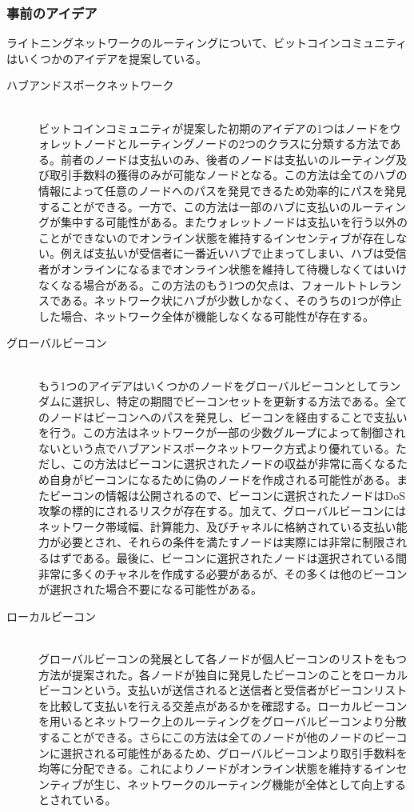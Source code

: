 \documentclass[12pt]{jarticle}
\begin{document}
\subsubsection{事前のアイデア} \label{sec:idea}
ライトニングネットワークのルーティングについて、ビットコインコミュニティはいくつかのアイデアを提案している。
\begin{description}
\item[ハブアンドスポークネットワーク]\leavevmode \\ 
ビットコインコミュニティが提案した初期のアイデア\cite{idea1}の1つはノードをウォレットノードとルーティングノードの2つのクラスに分類する方法である。前者のノードは支払いのみ、後者のノードは支払いのルーティング及び取引手数料の獲得のみが可能なノードとなる。この方法は全てのハブの情報によって任意のノードへのパスを発見できるため効率的にパスを発見することができる。一方で、この方法は一部のハブに支払いのルーティングが集中する可能性がある。またウォレットノードは支払いを行う以外のことができないのでオンライン状態を維持するインセンティブが存在しない。例えば支払いが受信者に一番近いハブで止まってしまい、ハブは受信者がオンラインになるまでオンライン状態を維持して待機しなくてはいけなくなる場合がある。この方法のもう1つの欠点は、フォールトトレランスである。ネットワーク状にハブが少数しかなく、そのうちの1つが停止した場合、ネットワーク全体が機能しなくなる可能性が存在する。
\\

\item[グローバルビーコン] \leavevmode \\
もう1つのアイデア\cite{idea2}はいくつかのノードをグローバルビーコンとしてランダムに選択し、特定の期間でビーコンセットを更新する方法である。全てのノードはビーコンへのパスを発見し、ビーコンを経由することで支払いを行う。この方法はネットワークが一部の少数グループによって制御されないという点でハブアンドスポークネットワーク方式より優れている。ただし、この方法はビーコンに選択されたノードの収益が非常に高くなるため自身がビーコンになるために偽のノードを作成される可能性がある。またビーコンの情報は公開されるので、ビーコンに選択されたノードはDoS攻撃の標的にされるリスクが存在する。加えて、グローバルビーコンにはネットワーク帯域幅、計算能力、及びチャネルに格納されている支払い能力が必要とされ、それらの条件を満たすノードは実際には非常に制限されるはずである。最後に、ビーコンに選択されたノードは選択されている間非常に多くのチャネルを作成する必要があるが、その多くは他のビーコンが選択された場合不要になる可能性がある。

\item[ローカルビーコン]\leavevmode \\
グローバルビーコンの発展として各ノードが個人ビーコンのリストをもつ方法が提案された\cite{idea3}。各ノードが独自に発見したビーコンのことをローカルビーコンという。支払いが送信されると送信者と受信者がビーコンリストを比較して支払いを行える交差点があるかを確認する。ローカルビーコンを用いるとネットワーク上のルーティングをグローバルビーコンより分散することができる。さらにこの方法は全てのノードが他のノードのビーコンに選択される可能性があるため、グローバルビーコンより取引手数料を均等に分配できる。これによりノードがオンライン状態を維持するインセンティブが生じ、ネットワークのルーティング機能が全体として向上するとされている。
\end{description}
\end{document}
